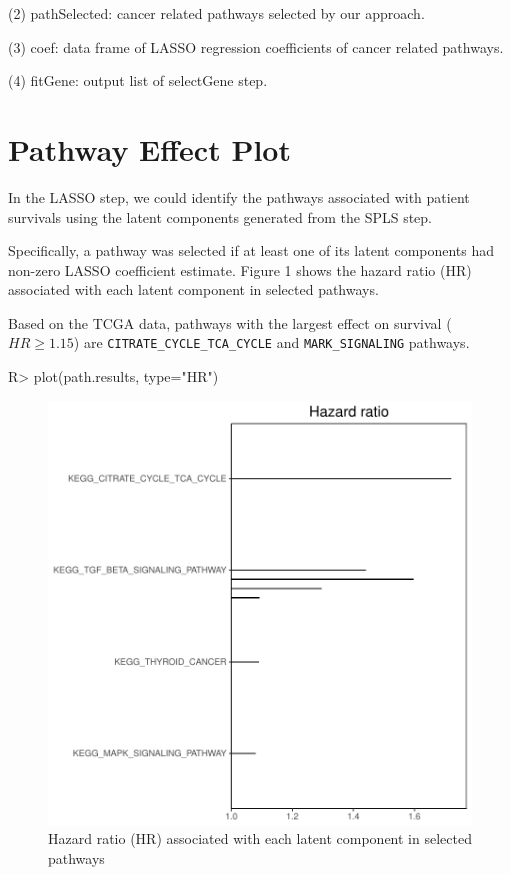 \documentclass[11pt]{article}
\begin{document}
(2) pathSelected: cancer related pathways selected by our approach.

(3) coef: data frame of LASSO regression coefficients of cancer related pathways.

(4) fitGene: output list of selectGene step.


\section{Pathway Effect Plot}
In the LASSO step, we could identify the pathways associated with patient survivals using the latent components generated from the SPLS step.

Specifically, a pathway was selected if at least one of its latent components had non-zero LASSO coefficient estimate. Figure 1 shows the hazard ratio (HR) associated with each latent component in selected pathways.

Based on the TCGA data, pathways with the largest effect on survival ($HR \geq 1.15$) are \texttt{CITRATE\_CYCLE\_TCA\_CYCLE} and \texttt{MARK\_SIGNALING} pathways.

\begin{Schunk}
\begin{Sinput}
R> plot(path.results, type="HR")
\end{Sinput}
\end{Schunk}


\begin{figure}[tbh]
\begin{center}
\includegraphics{PICS-example-plot1}
\caption{Hazard ratio (HR) associated with each latent component in selected pathways}
\end{center}
\end{figure}
\end{document}
